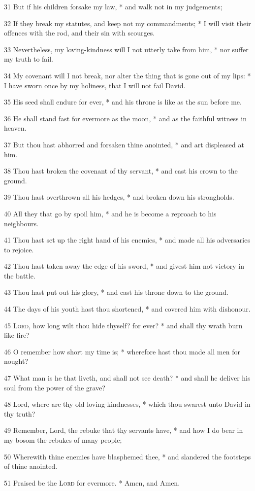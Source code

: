 31 But if his children forsake my law, * and walk not in my judgements;\par
32 If they break my statutes, and keep not my commandments; * I will visit their offences with the rod, and their sin with scourges.\par
33 Nevertheless, my loving-kindness will I not utterly take from him, * nor suffer my truth to fail.\par
34 My covenant will I not break, nor alter the thing that is gone out of my lips: * I have sworn once by my holiness, that I will not fail David.\par
35 His seed shall endure for ever, * and his throne is like as the sun before me.\par
36 He shall stand fast for evermore as the moon, * and as the faithful witness in heaven.\par
37 But thou hast abhorred and forsaken thine anointed, * and art displeased at him.\par
38 Thou hast broken the covenant of thy servant, * and cast his crown to the ground.\par
39 Thou hast overthrown all his hedges, * and broken down his strongholds.\par
40 All they that go by spoil him, * and he is become a reproach to his neighbours.\par
41 Thou hast set up the right hand of his enemies, * and made all his adversaries to rejoice.\par
42 Thou hast taken away the edge of his sword, * and givest him not victory in the battle.\par
43 Thou hast put out his glory, * and cast his throne down to the ground.\par
44 The days of his youth hast thou shortened, * and covered him with dishonour.\par
45 {\textsc{Lord}}, how long wilt thou hide thyself? for ever? * and shall thy wrath burn like fire?\par
46 O remember how short my time is; * wherefore hast thou made all men for nought?\par
47 What man is he that liveth, and shall not see death? * and shall he deliver his soul from the power of the grave?\par
48 Lord, where are thy old loving-kindnesses, * which thou swarest unto David in thy truth?\par
49 Remember, Lord, the rebuke that thy servants have, * and how I do bear in my bosom the rebukes of many people;\par
50 Wherewith thine enemies have blasphemed thee, * and slandered the footsteps of thine anointed.\par
51 Praised be the {\textsc{Lord}} for evermore. * Amen, and Amen.
